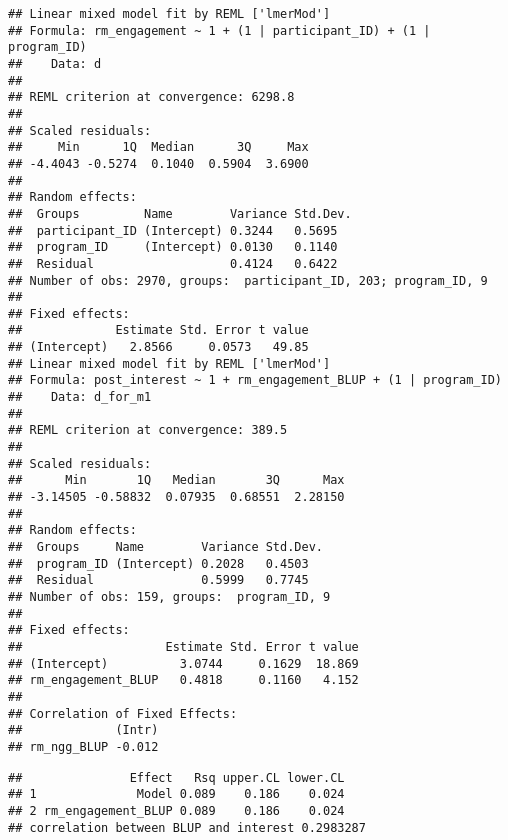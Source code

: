 \documentclass[man]{apa6}
\theoremstyle{definition}
\theoremstyle{definition}
\theoremstyle{definition}
\theoremstyle{remark}
\begin{document}
\begin{verbatim}
## Linear mixed model fit by REML ['lmerMod']
## Formula: rm_engagement ~ 1 + (1 | participant_ID) + (1 | program_ID)
##    Data: d
## 
## REML criterion at convergence: 6298.8
## 
## Scaled residuals: 
##     Min      1Q  Median      3Q     Max 
## -4.4043 -0.5274  0.1040  0.5904  3.6900 
## 
## Random effects:
##  Groups         Name        Variance Std.Dev.
##  participant_ID (Intercept) 0.3244   0.5695  
##  program_ID     (Intercept) 0.0130   0.1140  
##  Residual                   0.4124   0.6422  
## Number of obs: 2970, groups:  participant_ID, 203; program_ID, 9
## 
## Fixed effects:
##             Estimate Std. Error t value
## (Intercept)   2.8566     0.0573   49.85
## Linear mixed model fit by REML ['lmerMod']
## Formula: post_interest ~ 1 + rm_engagement_BLUP + (1 | program_ID)
##    Data: d_for_m1
## 
## REML criterion at convergence: 389.5
## 
## Scaled residuals: 
##      Min       1Q   Median       3Q      Max 
## -3.14505 -0.58832  0.07935  0.68551  2.28150 
## 
## Random effects:
##  Groups     Name        Variance Std.Dev.
##  program_ID (Intercept) 0.2028   0.4503  
##  Residual               0.5999   0.7745  
## Number of obs: 159, groups:  program_ID, 9
## 
## Fixed effects:
##                    Estimate Std. Error t value
## (Intercept)          3.0744     0.1629  18.869
## rm_engagement_BLUP   0.4818     0.1160   4.152
## 
## Correlation of Fixed Effects:
##             (Intr)
## rm_ngg_BLUP -0.012
\end{verbatim}

\begin{verbatim}
##               Effect   Rsq upper.CL lower.CL
## 1              Model 0.089    0.186    0.024
## 2 rm_engagement_BLUP 0.089    0.186    0.024
## correlation between BLUP and interest 0.2983287
\end{verbatim}
\end{document}
